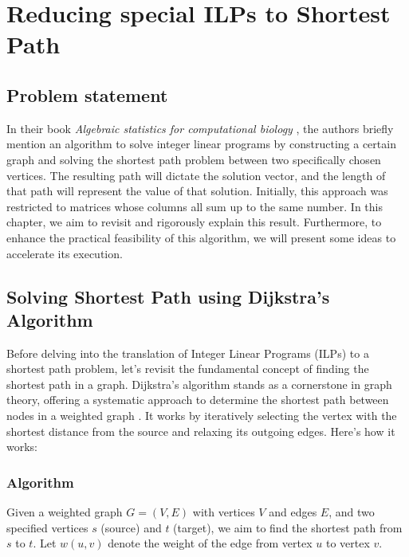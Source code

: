 \chapter{Reducing special ILPs to Shortest Path}
\section{Problem statement}
In their book \textit{Algebraic statistics for computational biology} \cite{algebraic_statistics}, the authors briefly mention an algorithm to solve integer linear programs by constructing a certain graph and solving the shortest path problem between two specifically chosen vertices. The resulting path will dictate the solution vector, and the length of that path will represent the value of that solution. Initially, this approach was restricted to matrices whose columns all sum up to the same number. In this chapter, we aim to revisit and rigorously explain this result. Furthermore, to enhance the practical feasibility of this algorithm, we will present some ideas to accelerate its execution.

\section{Solving Shortest Path using Dijkstra's Algorithm}
Before delving into the translation of Integer Linear Programs (ILPs) to a shortest path problem, let's revisit the fundamental concept of finding the shortest path in a graph. Dijkstra's algorithm stands as a cornerstone in graph theory, offering a systematic approach to determine the shortest path between nodes in a weighted graph \cite{introduction_to_algorithms}. It works by iteratively selecting the vertex with the shortest distance from the source and relaxing its outgoing edges. Here's how it works:

\subsection{Algorithm}
Given a weighted graph $G = (V, E)$ with vertices $V$ and edges $E$, and two specified vertices $s$ (source) and $t$ (target), we aim to find the shortest path from $s$ to $t$. Let $w(u, v)$ denote the weight of the edge from vertex $u$ to vertex $v$.

